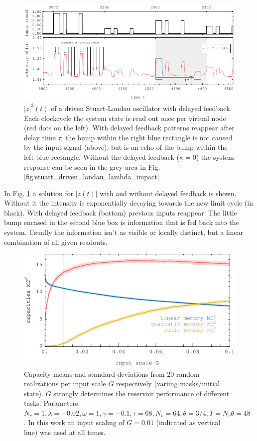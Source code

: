 \begin{figure}
	\centering
	\includegraphics[width=15cm]{pics/driven_and_delayed}
	\caption{$|z|^{2}(t)$ of a driven Stuart-Landau oscillator with delayed feedback. Each clockcycle the system state is read out once per virtual node (red dots on the left). With delayed feedback patterns reappear after delay time $\tau$: the bump within the right blue rectangle is not caused by the input signal (above), but is an echo of the bump within the left blue rectangle. Without the delayed feedback ($\kappa=0$) the system response can be seen in the grey area in Fig.\ref{fig:stuart_driven_landau_lambda_impact}}
	\label{fig:driven_and_delayed}
\end{figure}

In Fig. \ref{fig:driven_and_delayed} a solution for $|z(t)|$ with and without delayed feedback is shown. Without it the intensity is exponentially decaying towards the new limit cycle (in black). With delayed feedback (bottom) previous inputs reappear: The little bump encased in the second blue box is information that is fed back into the system. Usually the information isn't as visible or locally distinct, but a linear combination of all given readouts.

\begin{figure}\label{fig:input_capacities}\centering
	\includegraphics[width=12cm]{pics/input_capacities}
	\caption{Capacity means and standard deviations from $20$ random realizations per input scale $G$ respectively (variing masks/initial state). $G$ strongly determines the reservoir performance of different tasks. Parameters: $N_r=1, \lambda=-0.02, \omega=1, \gamma=-0.1, \tau=68, N_v=64, \theta=3/4, T=N_v \theta = 48$. In this work an input scaling of $G=0.01$ (indicated as vertical line) was used at all times.}
\end{figure}


